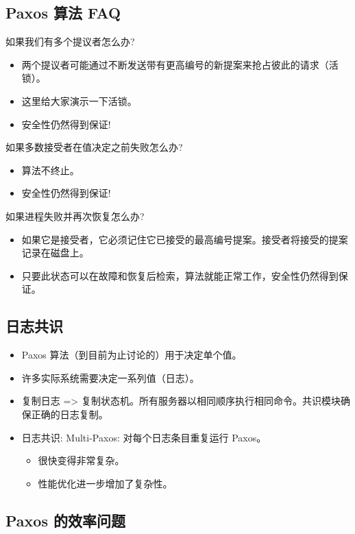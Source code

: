 \subsection{Paxos 算法 FAQ}

如果我们有多个提议者怎么办?
\begin{itemize}
\item 两个提议者可能通过不断发送带有更高编号的新提案来抢占彼此的请求（活锁）。
\item 这里给大家演示一下活锁。
\item 安全性仍然得到保证!
\end{itemize}

如果多数接受者在值决定之前失败怎么办?
\begin{itemize}
\item 算法不终止。
\item 安全性仍然得到保证!
\end{itemize}

如果进程失败并再次恢复怎么办?
\begin{itemize}
\item 如果它是接受者，它必须记住它已接受的最高编号提案。接受者将接受的提案记录在磁盘上。
\item 只要此状态可以在故障和恢复后检索，算法就能正常工作，安全性仍然得到保证。
\end{itemize}

\subsection{日志共识}

\begin{itemize}
\item Paxos 算法（到目前为止讨论的）用于决定单个值。
\item 许多实际系统需要决定一系列值（日志）。
\item 复制日志 => 复制状态机。所有服务器以相同顺序执行相同命令。共识模块确保正确的日志复制。
\item 日志共识: Multi-Paxos: 对每个日志条目重复运行 Paxos。
  \begin{itemize}
  \item 很快变得非常复杂。
  \item 性能优化进一步增加了复杂性。
  \end{itemize}
\end{itemize}

\subsection{Paxos 的效率问题}

